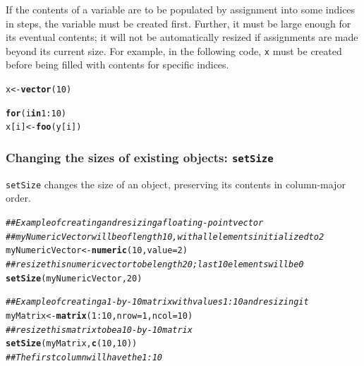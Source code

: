 \documentclass[12pt,oneside]{book}\usepackage[]{graphicx}\usepackage[]{color}
\makeatletter
\newcommand{\hlnum}[1]{\textcolor[rgb]{0.686,0.059,0.569}{#1}}%
\newcommand{\hlcom}[1]{\textcolor[rgb]{0.678,0.584,0.686}{\textit{#1}}}%
\newcommand{\hlopt}[1]{\textcolor[rgb]{0,0,0}{#1}}%
\newcommand{\hlstd}[1]{\textcolor[rgb]{0.345,0.345,0.345}{#1}}%
\newcommand{\hlkwa}[1]{\textcolor[rgb]{0.161,0.373,0.58}{\textbf{#1}}}%
\newcommand{\hlkwb}[1]{\textcolor[rgb]{0.69,0.353,0.396}{#1}}%
\newcommand{\hlkwc}[1]{\textcolor[rgb]{0.333,0.667,0.333}{#1}}%
\newcommand{\hlkwd}[1]{\textcolor[rgb]{0.737,0.353,0.396}{\textbf{#1}}}%
\newenvironment{kframe}{%
 \def\at@end@of@kframe{}%
 \ifinner\ifhmode%
  \def\at@end@of@kframe{\end{minipage}}%
  \begin{minipage}{\columnwidth}%
 \fi\fi%
 \def\FrameCommand##1{\hskip\@totalleftmargin \hskip-\fboxsep
 \colorbox{shadecolor}{##1}\hskip-\fboxsep
     \hskip-\linewidth \hskip-\@totalleftmargin \hskip\columnwidth}%
 \MakeFramed {\advance\hsize-\width
   \@totalleftmargin\z@ \linewidth\hsize
   \@setminipage}}%
 {\par\unskip\endMakeFramed%
 \at@end@of@kframe}
\newenvironment{knitrout}{}{} %
\def\cd#1{\texttt{#1}}
\makeatother
\begin{document}
If the contents of a variable are to be populated by assignment into
some indices in steps, the variable must be created first.  Further,
it must be large enough for its eventual contents; it will not be automatically
resized if assignments are made beyond its current size.  For example,
in the following code, \cd{x} must be created before being filled with
contents for specific indices.

\begin{knitrout}
\color{fgcolor}\begin{kframe}
\begin{alltt}
\hlstd{x} \hlkwb{<-} \hlkwd{vector}\hlstd{(}\hlnum{10}\hlstd{)}

\hlkwa{for}\hlstd{(i} \hlkwa{in} \hlnum{1}\hlopt{:}\hlnum{10}\hlstd{)}
   \hlstd{x[i]} \hlkwb{<-} \hlkwd{foo}\hlstd{(y[i])}
\end{alltt}
\end{kframe}
\end{knitrout}



\subsubsection{Changing the sizes of existing objects: \cd{setSize}}
\label{sec:chang-sizes-exist}

\cd{setSize} changes the size of an object, preserving its contents in
column-major order.  

\begin{knitrout}
\color{fgcolor}\begin{kframe}
\begin{alltt}
\hlcom{## Example of creating and resizing a floating-point vector}
\hlcom{## myNumericVector will be of length 10, with all elements initialized to 2 }
\hlstd{myNumericVector} \hlkwb{<-} \hlkwd{numeric}\hlstd{(}\hlnum{10}\hlstd{,} \hlkwc{value} \hlstd{=} \hlnum{2}\hlstd{)}
\hlcom{## resize this numeric vector to be length 20; last 10 elements will be 0}
\hlkwd{setSize}\hlstd{(myNumericVector,} \hlnum{20}\hlstd{)}
\end{alltt}
\end{kframe}
\end{knitrout}

\begin{knitrout}
\color{fgcolor}\begin{kframe}
\begin{alltt}
\hlcom{## Example of creating a 1-by-10 matrix with values 1:10 and resizing it}
\hlstd{myMatrix} \hlkwb{<-} \hlkwd{matrix}\hlstd{(}\hlnum{1}\hlopt{:}\hlnum{10}\hlstd{,} \hlkwc{nrow} \hlstd{=} \hlnum{1}\hlstd{,} \hlkwc{ncol} \hlstd{=} \hlnum{10}\hlstd{)}
\hlcom{## resize this matrix to be a 10-by-10 matrix}
\hlkwd{setSize}\hlstd{(myMatrix,} \hlkwd{c}\hlstd{(}\hlnum{10}\hlstd{,} \hlnum{10}\hlstd{))}
\hlcom{## The first column will have the 1:10}
\end{alltt}
\end{kframe}
\end{knitrout}
\end{document}
